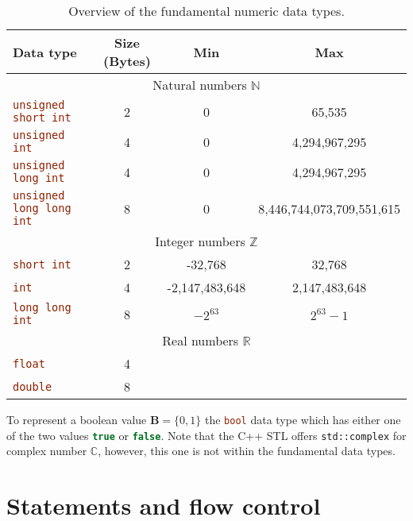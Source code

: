 \begin{table}[h]
\centering
\begin{tabular}{lccc}
\toprule
Data type & Size (Bytes) & Min & Max \\\midrule
\multicolumn{4}{c}{Natural numbers $\mathbb{N}$ }\\\midrule
\lstinline[language=C++]|unsigned short int| & 2 & 0 & 65,535  \\ 
\lstinline[language=C++]|unsigned int| & 4 & 0 & 4,294,967,295 \\ 
\lstinline[language=C++]|unsigned long int| & 4 & 0 & 4,294,967,295 \\ 
\lstinline[language=C++]|unsigned long long int| & 8 & 0 & 8,446,744,073,709,551,615 \\ \midrule
\multicolumn{4}{c}{Integer numbers $\mathbb{Z}$ }\\\midrule
\lstinline[language=C++]|short int| & 2 & -32,768 & 32,768 \\
\lstinline[language=C++]|int| & 4 & -2,147,483,648 & 2,147,483,648 \\
\lstinline[language=C++]|long long int| & 8 & $-2^{63}$ & $2^{63}-1$ \\\midrule
\multicolumn{4}{c}{Real numbers $\mathbb{R}$ }\\\midrule
\lstinline[language=C++]|float| & 4 &  &  \\
\lstinline[language=C++]|double| & 8 &  &  \\
\bottomrule
\end{tabular} 
\caption{Overview of the fundamental numeric data types.}
\label{chapter2:table:datatypes}
\end{table}

To represent a boolean value $\mathbf{B}=\{0,1\}$ the \lstinline[language=C++]|bool| data type which has either one of the two values \lstinline[language=C++]|true| or \lstinline[language=C++]|false|. Note that the C++ STL offers \lstinline|std::complex| for complex number $\mathbb{C}$, however, this one is not within the fundamental data types.

\section{Statements and flow control}

